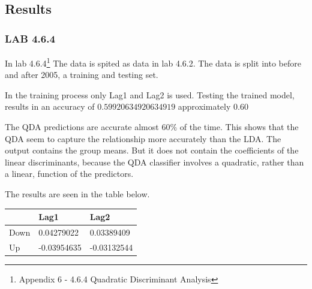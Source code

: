 \subsection{Results}
\subsubsection*{LAB 4.6.4}

In lab 4.6.4\footnote{Appendix 6 - 4.6.4 Quadratic Discriminant Analysis} The data is spited as data in lab 4.6.2. The data is split into before and after 2005, a training and testing set.

In the training process only Lag1 and Lag2 is used. Testing the trained model, results in an accuracy of $0.59920634920634919$ approximately $0.60$

The QDA predictions are accurate almost $60\%$ of the time. This shows that the QDA seem to capture the relationship more accurately than the LDA. The output contains the group means. But it does not contain the coefficients of the linear discriminants, because the QDA classifier involves a quadratic, rather than a linear, function of the predictors.

The results are seen in the table below.

\begin{longtable}[]{@{}lll@{}}
	\toprule
	& Lag1 & Lag2\tabularnewline
	\midrule
	\endhead
	Down & 0.04279022 & 0.03389409\tabularnewline
	Up & -0.03954635 & -0.03132544\tabularnewline
	\bottomrule
\end{longtable}